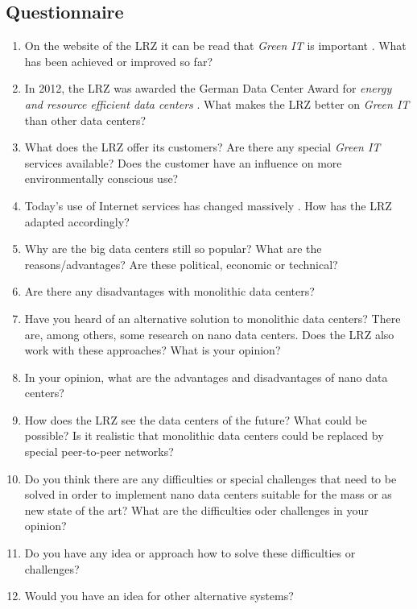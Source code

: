 \documentclass[sigchi-a, authorversion]{acmart}
\begin{document}
\nocite{*}



\begin{appendices}
\chapter{Questionnaire}
\begin{enumerate}
\label{appendix:quest}
\item On the website of the LRZ it can be read that \textit{Green IT} is important \cite{LRZGreenIT}. What has been achieved or improved so far?
\item In 2012, the LRZ was awarded the German Data Center Award for \textit{energy and resource efficient data centers} \cite{LRZGreenIT}. What makes the LRZ better on \textit{Green IT} than other data centers?
\item What does the LRZ offer its customers? Are there any special \textit{Green IT} services available? Does the customer have an influence on more environmentally conscious use?
\item Today's use of Internet services has changed massively \cite{TheZetta68:online}. How has the LRZ adapted accordingly?
\item Why are the big data centers still so popular? What are the reasons/advantages? Are these political, economic or technical?
\item Are there any disadvantages with monolithic data centers?
\item Have you heard of an alternative solution to monolithic data centers? There are, among others, some research on nano data centers. Does the LRZ also work with these approaches? What is your opinion?
\item In your opinion, what are the advantages and disadvantages of nano data centers?
\item How does the LRZ see the data centers of the future? What could be possible? Is it realistic that monolithic data centers could be replaced by special peer-to-peer networks?
\item Do you think there are any difficulties or special challenges that need to be solved in order to implement nano data centers suitable for the mass or as new state of the art? What are the difficulties oder challenges in your opinion?
\item Do you have any idea or approach how to solve these difficulties or challenges?
\item Would you have an idea for other alternative systems?
\end{enumerate}
\end{appendices}
\end{document}
